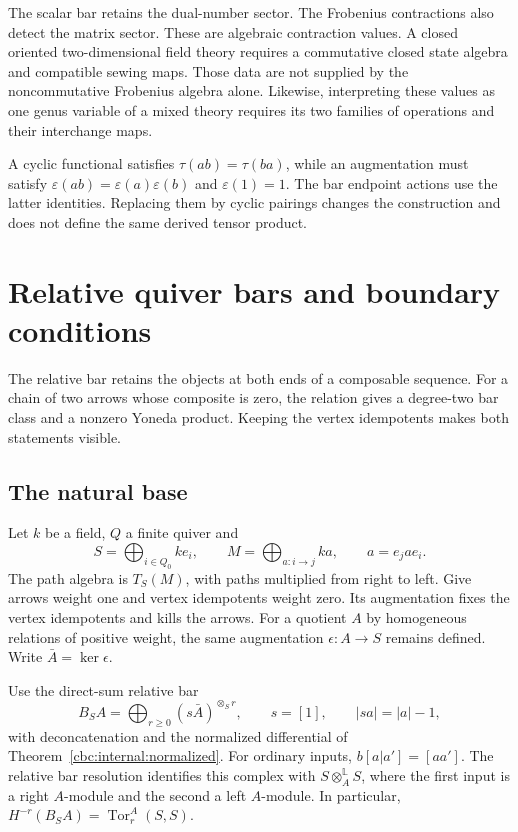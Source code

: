 The scalar bar retains the dual-number sector.
The Frobenius contractions also detect the matrix sector.
These are algebraic contraction values.
A closed oriented two-dimensional field theory requires a commutative closed state algebra and compatible sewing maps.
Those data are not supplied by the noncommutative Frobenius algebra alone.
Likewise, interpreting these values as one genus variable of a mixed theory requires its two families of operations and their interchange maps.

\begin{nogobox}[title={No-go theorem 13: a trace is not an augmentation}]
A cyclic functional satisfies $\tau(ab)=\tau(ba)$, while an augmentation must satisfy $\varepsilon(ab)=\varepsilon(a)\varepsilon(b)$ and $\varepsilon(1)=1$.
The bar endpoint actions use the latter identities.
Replacing them by cyclic pairings changes the construction and does not define the same derived tensor product.
\end{nogobox}

\chapter{Relative quiver bars and boundary conditions}\label{chap:quiver}
The relative bar retains the objects at both ends of a composable sequence.
For a chain of two arrows whose composite is zero, the relation gives a degree-two bar class and a nonzero Yoneda product.
Keeping the vertex idempotents makes both statements visible.

\section{The natural base}

Let $k$ be a field, $Q$ a finite quiver and
\[
 S=\bigoplus_{i\in Q_0}ke_i,\qquad
 M=\bigoplus_{a:i\to j}ka,\qquad a=e_jae_i.
\]
The path algebra is $T_S(M)$, with paths multiplied from right to left.
Give arrows weight one and vertex idempotents weight zero.
Its augmentation fixes the vertex idempotents and kills the arrows.
For a quotient $A$ by homogeneous relations of positive weight, the same augmentation $\epsilon:A\to S$ remains defined.
Write $\bar A=\ker\epsilon$.

Use the direct-sum relative bar
\[
 B_SA=\bigoplus_{r\ge0}(s\bar A)^{\otimes_S r},\qquad
 s=[1],\qquad |sa|=|a|-1,
\]
with deconcatenation and the normalized differential of Theorem~\ref{cbc:internal:normalized}.
For ordinary inputs, $b[a|a']= [aa']$.
The relative bar resolution identifies this complex with $S\otimes_A^{\mathbb L}S$, where the first input is a right $A$-module and the second a left $A$-module.
In particular, $H^{-r}(B_SA)=\operatorname{Tor}^A_r(S,S)$.

